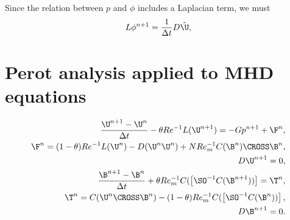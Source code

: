 \documentclass[11pt]{article}
\newcommand{\ReInv}{Re^{-1}}
\newcommand{\RemInv}{Re_m^{-1}}
\newcommand{\Al}{N Re_m^{-1}}
\begin{document}
Since the relation between $p$ and $\phi$ includes a Laplacian term, we must
\begin{equation}\begin{aligned}
L \phi^{n+1} = \frac{1}{\Delta t} D\hat{\U}, \\
\end{aligned} \end{equation}

\newpage
\section{Perot analysis applied to MHD equations}
\begin{equation}\begin{aligned}
\frac{\U^{n+1}-\U^n}{\Delta t} - \theta \ReInv L(\U^{n+1}) = - G p^{n+1} + \F^n , \\
\F^n = (1-\theta) \ReInv L(\U^n) - D(\U^n \U^n) + \Al C(\B^n) \CROSS \B^n, \\
 D \U^{n+1} = 0, \\
\frac{\B^{n+1}-\B^n}{\Delta t} + \theta \RemInv C (\left[ \SO^{-1} C(\B^{n+1})) \right] = \T^n, \\
\T^n = C (\U^n \CROSS \B^n) - (1-\theta) \RemInv C (\left[ \SO^{-1} C(\B^n)) \right], \\
 D \B^{n+1} = 0.
\end{aligned} \end{equation}
\end{document}

